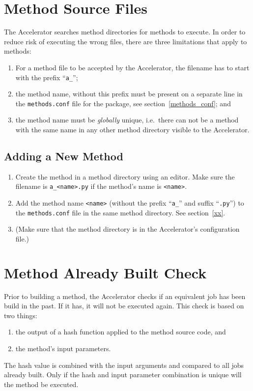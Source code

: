 \section{Method Source Files}

The Accelerator searches method directories for methods to execute.
In order to reduce risk of executing the wrong files, there are three
limitations that apply to methods:
\begin{enumerate}
\item For a method file to be accepted by the Accelerator, the
  filename has to start with the prefix ``\texttt{a\_}'';
\item the method name, without this prefix must be present on a
  separate line in the \texttt{methods.conf} file for the package, see
  section~\ref{methods_conf}; and
\item the method name must be \emph{globally} unique, i.e.\ there can
  not be a method with the same name in any other method directory
  visible to the Accelerator.
\end{enumerate}


\subsection*{Adding a New Method}
\begin{enumerate}
  \item Create the method in a method directory using an editor.  Make
    sure the filename is \texttt{a\_<name>.py} if the method's name is
    \texttt{<name>}.
  \item Add the method name \texttt{<name>} (without the prefix ``\texttt{a\_}'' and
    suffix ``\texttt{.py}'') to the \texttt{methods.conf} file in the
    same method directory.  See section~\ref{xx}.
  \item (Make sure that the method directory is in the Accelerator's
    configuration file.)
\end{enumerate}


\section{Method Already Built Check}

Prior to building a method, the Accelerator checks if an equivalent
job has been build in the past.  If it has, it will not be executed
again.  This check is based on two things:
\begin{enumerate}
\item  the output of a hash function applied to the method source code, and
\item  the method's input parameters.
\end{enumerate}
The hash value is combined with the input arguments and compared to
all jobs already built.  Only if the hash and input parameter
combination is unique will the method be executed.

